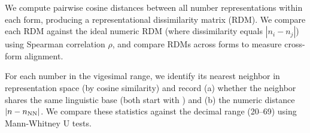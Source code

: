 We compute pairwise cosine distances between all number representations within each form, producing a representational dissimilarity matrix (RDM).
We compare each RDM against the ideal numeric RDM (where dissimilarity equals $|n_i - n_j|$) using Spearman correlation $\rho$, and compare RDMs across forms to measure cross-form alignment.

For each number in the vigesimal range, we identify its nearest neighbor in representation space (by cosine similarity) and record (a) whether the neighbor shares the same linguistic base (\eg both start with \quatrevingt) and (b) the numeric distance $|n - n_{\text{NN}}|$.
We compare these statistics against the decimal range (20--69) using Mann-Whitney U tests.
